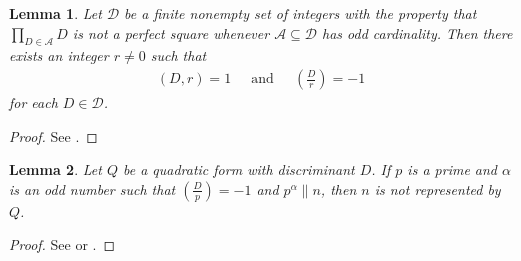\documentclass[a4paper]{amsart}
\newtheorem{lem}{Lemma}
\newcommand{\1}{\mathbbm{1}}
\begin{document}
\begin{lem}\label{LemNonRes}
Let $\mathcal{D}$ be a finite nonempty set of integers with the property that $\prod_{D\in\mathcal{A}}D$ is not a perfect square whenever $\mathcal{A}\subseteq\mathcal{D}$ has odd cardinality. Then there exists an integer $r\neq 0$ such that
\begin{align*}
(D,r)=1 \ \ \ \ \ \textrm{ and } \ \ \ \ \ \left(\frac{D}{r}\right) = -1
\end{align*}
for each $D\in\mathcal{D}$.
\end{lem}
\begin{proof}
See \cite[Lemma A.1]{MS}.
\end{proof}


\begin{lem}\label{LemPrime}
Let $Q$ be a quadratic form with discriminant $D$. If $p$ is a prime and $\alpha$ is an odd number such that $\left(\frac{D}{p}\right)=-1$ and $p^{\alpha}\| n$, then $n$ is not represented by $Q$.
\end{lem}
\begin{proof}
See \cite[Lemma A.2]{MS} or \cite[Lemma 7]{DEKKM}.
\end{proof}
\end{document}
